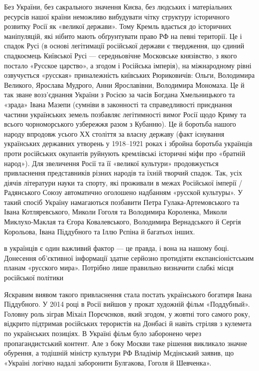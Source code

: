 Без України, без сакрального значення Києва, без людських і матеріальних
ресурсів нашої країни неможливо вибудувати чітку структуру історичного розвитку
Росії як «великої держави». Тому Кремль вдається до історичних маніпуляцій, які
нібито мають обґрунтувати право РФ на певні території. Це і спадок Русі (в
основі легітимації російської держави є твердження, що єдиний спадкоємець
Київської Русі — середньовічне Московське князівство, з якого постало «Русское
царство», а згодом і Російська імперія), на міжнародному рівні озвучується
«русская» приналежність київських Рюриковичів: Ольги, Володимира Великого,
Ярослава Мудрого, Анни Ярославівни, Володимира Мономаха. Це й так зване
возз’єднання України з Росією за часів Богдана Хмельницького та «зрада» Івана
Мазепи (сумніви в законності та справедливості приєднання частини українських
земель позбавляє легітимності вимог Росії щодо Криму та всього чорноморського
узбережжя разом з Кубанню). Це й боротьба нашого народу впродовж усього ХХ
століття за власну державу (факт існування українських державних утворень у
1918–1921 роках і збройна боротьба українців проти російських окупантів
руйнують кремлівські історичні міфи про «братній народ»). Для звеличення Росії
та її «великої культури» продовжується привласнення представників різних
народів та їхній творчий спадок. Так, усіх діячів літератури науки та спорту,
які проживали в межах Російської імперії / Радянського Союзу автоматично
оголошено надбанням «русской культуры». У такий спосіб Україну намагаються
позбавити Петра Гулака-Артемовського та Івана Котляревського, Миколи Гоголя та
Володимира Короленка, Миколи Миклухо-Маклая та Єгора Ковалевського, Володимира
Вернадського й Сергія Корольова, Івана Піддубного та Іллю Рєпіна й багатьох
інших.

\begin{zznagolos}
в українців є один важливий фактор — це правда, і вона на нашому боці.
Донесення об’єктивної інформації здатне серйозно протидіяти експансіоністським
планам «русского мира». Потрібно лише правильно визначити слабкі місця
російської політики	
\end{zznagolos}

Яскравим виявом такого привласнення стала постать українського богатиря Івана
Піддубного. У 2014 році в Росії вийшов у прокат художній фільм «Поддубный».
Головну роль зіграв Міхаіл Порєчєнков, який згодом, у жовтні того самого року,
відкрито підтримав російських терористів на Донбасі й навіть стріляв з кулемета
по українських позиціях. В Україні фільм було заборонено через
пропагандистський контент. Але з боку Москви таке рішення викликало значне
обурення, а тодішній міністр культури РФ Владімір Мєдінський заявив, що
«Україні логічно надалі заборонити Булгакова, Гоголя й Шевченка».

